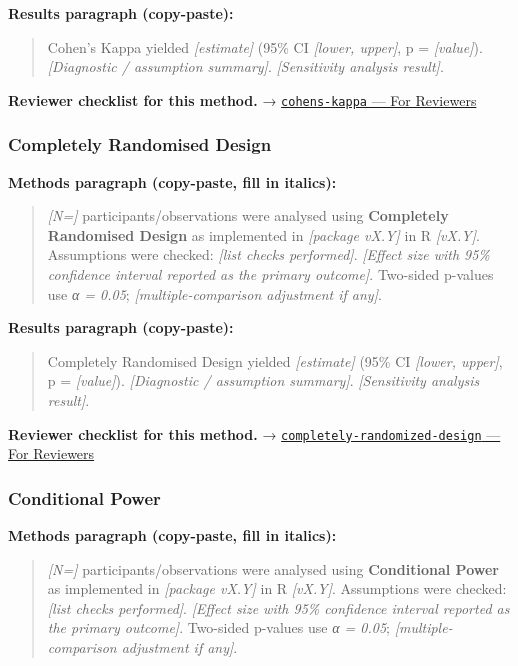 \documentclass[
]{article}
\begin{document}
\textbf{Results paragraph (copy-paste):}

\begin{quote}
Cohen's Kappa yielded \emph{{[}estimate{]}} (95\% CI \emph{{[}lower,
upper{]}}, p = \emph{{[}value{]}}). \emph{{[}Diagnostic / assumption
summary{]}}. \emph{{[}Sensitivity analysis result{]}}.
\end{quote}

\textbf{Reviewer checklist for this method.} →
\href{../chapters/14-clinical/cohens-kappa.Rmd\#for-reviewers}{\texttt{cohens-kappa}
--- For Reviewers}

\subsubsection{Completely Randomised
Design}\label{completely-randomised-design}

\textbf{Methods paragraph (copy-paste, fill in italics):}

\begin{quote}
\emph{{[}N={]}} participants/observations were analysed using
\textbf{Completely Randomised Design} as implemented in \emph{{[}package
vX.Y{]}} in R \emph{{[}vX.Y{]}}. Assumptions were checked: \emph{{[}list
checks performed{]}}. \emph{{[}Effect size with 95\% confidence interval
reported as the primary outcome{]}}. Two-sided p-values use \emph{α =
0.05}; \emph{{[}multiple-comparison adjustment if any{]}}.
\end{quote}

\textbf{Results paragraph (copy-paste):}

\begin{quote}
Completely Randomised Design yielded \emph{{[}estimate{]}} (95\% CI
\emph{{[}lower, upper{]}}, p = \emph{{[}value{]}}). \emph{{[}Diagnostic
/ assumption summary{]}}. \emph{{[}Sensitivity analysis result{]}}.
\end{quote}

\textbf{Reviewer checklist for this method.} →
\href{../chapters/16-design/completely-randomized-design.Rmd\#for-reviewers}{\texttt{completely-randomized-design}
--- For Reviewers}

\subsubsection{Conditional Power}\label{conditional-power}

\textbf{Methods paragraph (copy-paste, fill in italics):}

\begin{quote}
\emph{{[}N={]}} participants/observations were analysed using
\textbf{Conditional Power} as implemented in \emph{{[}package vX.Y{]}}
in R \emph{{[}vX.Y{]}}. Assumptions were checked: \emph{{[}list checks
performed{]}}. \emph{{[}Effect size with 95\% confidence interval
reported as the primary outcome{]}}. Two-sided p-values use \emph{α =
0.05}; \emph{{[}multiple-comparison adjustment if any{]}}.
\end{quote}
\end{document}
